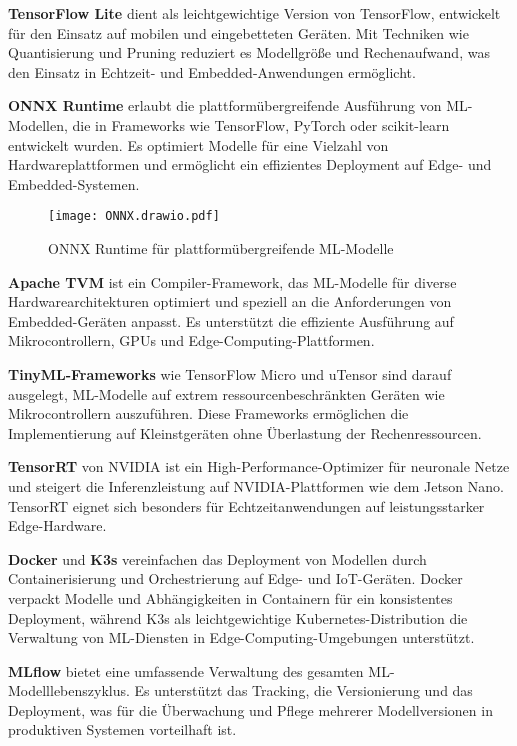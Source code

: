 \textbf{TensorFlow Lite} dient als leichtgewichtige Version von TensorFlow, entwickelt für den Einsatz auf mobilen und eingebetteten Geräten. 
Mit Techniken wie Quantisierung und Pruning reduziert es Modellgröße und Rechenaufwand, was den Einsatz in Echtzeit- und Embedded-Anwendungen ermöglicht.

\textbf{ONNX Runtime} erlaubt die plattformübergreifende Ausführung von ML-Modellen, die in Frameworks wie TensorFlow, PyTorch oder scikit-learn entwickelt wurden. 
Es optimiert Modelle für eine Vielzahl von Hardwareplattformen und ermöglicht ein effizientes Deployment auf Edge- und Embedded-Systemen.

\begin{figure}[h!]
    \centering
    \texttt{[image: ONNX.drawio.pdf]} 
    \caption{ONNX Runtime für plattformübergreifende ML-Modelle} 
    \label{fig:onnxruntime} %
\end{figure}

\textbf{Apache TVM} ist ein Compiler-Framework, das ML-Modelle für diverse Hardwarearchitekturen optimiert und speziell an die Anforderungen von Embedded-Geräten anpasst. 
Es unterstützt die effiziente Ausführung auf Mikrocontrollern, GPUs und Edge-Computing-Plattformen.

\textbf{TinyML-Frameworks} wie TensorFlow Micro und uTensor sind darauf ausgelegt, ML-Modelle auf extrem ressourcenbeschränkten Geräten wie Mikrocontrollern auszuführen. 
Diese Frameworks ermöglichen die Implementierung auf Kleinstgeräten ohne Überlastung der Rechenressourcen.

\textbf{TensorRT} von NVIDIA ist ein High-Performance-Optimizer für neuronale Netze und steigert die Inferenzleistung auf NVIDIA-Plattformen wie dem Jetson Nano. 
TensorRT eignet sich besonders für Echtzeitanwendungen auf leistungsstarker Edge-Hardware.

\textbf{Docker} und \textbf{K3s} vereinfachen das Deployment von Modellen durch Containerisierung und Orchestrierung auf Edge- und IoT-Geräten. Docker verpackt Modelle und Abhängigkeiten in Containern für ein konsistentes Deployment, während K3s als leichtgewichtige Kubernetes-Distribution die Verwaltung von ML-Diensten in Edge-Computing-Umgebungen unterstützt.

\textbf{MLflow} bietet eine umfassende Verwaltung des gesamten ML-Modelllebenszyklus. Es unterstützt das Tracking, die Versionierung und das Deployment, was für die Überwachung und Pflege mehrerer Modellversionen in produktiven Systemen vorteilhaft ist.

